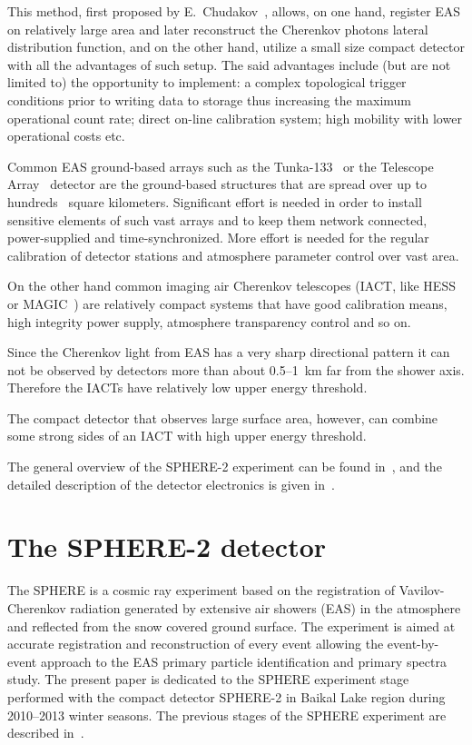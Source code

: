 \documentclass[final,5p,times,twocolumn]{elsarticle}
\begin{document}
This method, first proposed by E.~Chudakov~\cite{chu74}, allows, on one hand, register EAS on relatively large area and later reconstruct the Cherenkov photons lateral distribution function, and on the other hand, utilize a small size compact detector with all the advantages of such setup. The said advantages include (but are not limited to) the opportunity to implement: a complex topological trigger conditions prior to writing data to storage thus increasing the maximum operational count rate; direct on-line calibration system; high mobility with lower operational costs etc.

Common EAS ground-based arrays such as the Tunka-133~\cite{} or the Telescope Array~\cite{abu12} detector are the ground-based structures that are spread over up to hundreds~\cite{abu12} square kilometers. Significant effort is needed in order to install sensitive elements of such vast arrays and to keep them network connected, power-supplied and time-synchronized. More effort is needed for the regular calibration of detector stations and atmosphere parameter control over vast area. 

On the other hand common imaging air Cherenkov telescopes (IACT, like HESS~\cite{} or MAGIC~\cite{}) are relatively compact systems that have good calibration means, high integrity power supply, atmosphere transparency control and so on.

Since the Cherenkov light from EAS has a very sharp directional pattern it can not be observed by detectors more than about 0.5--1~km far from the shower axis. Therefore the IACTs have relatively low upper energy threshold.

The compact detector that observes large surface area, however, can combine some strong sides of an IACT with high upper energy threshold. 

The general overview of the SPHERE-2 experiment can be found in~\cite{Ant15a}, and the detailed description of the detector electronics is given in~\cite{Ant20}.


\section{The SPHERE-2 detector \label{sect:detector}}
The SPHERE is a cosmic ray experiment based on the registration of Vavilov-Cherenkov radiation generated by extensive air showers (EAS) in the atmosphere and reflected from the snow covered ground surface. The experiment is aimed at accurate registration and reconstruction of every event allowing the event-by-event approach to the EAS primary particle identification and primary spectra study. The present paper is dedicated to the SPHERE experiment stage performed with the compact detector SPHERE-2 in Baikal Lake region during 2010--2013 winter seasons. The previous stages of the SPHERE experiment are described in~\cite{Ant15a}. %
\end{document}
